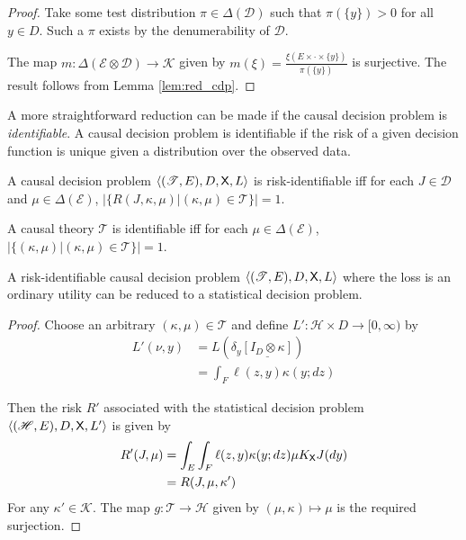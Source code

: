\begin{proof}
Take some test distribution $\pi\in \Delta(\mathcal{D})$ such that $\pi(\{y\})>0$ for all $y\in D$. Such a $\pi$ exists by the denumerability of $\mathcal{D}$.

The map $m:\Delta(\mathcal{E}\otimes\mathcal{D})\to \mathscr{K}$ given by $m(\xi) = \frac{\xi(E\times \cdot\times \{y\})}{\pi(\{y\})}$ is surjective. The result follows from Lemma \ref{lem:red_cdp}.

\end{proof}

A more straightforward reduction can be made if the causal decision problem is \emph{identifiable}. A causal decision problem is identifiable if the risk of a given decision function is unique given a distribution over the observed data.

\begin{definition}[Identifiability]
A causal decision problem $\langle (\mathscr{T}, E), D, \mathsf{X}, L \rangle$ is risk-identifiable iff for each $J\in \mathscr{D}$ and $\mu\in \Delta(\mathcal{E})$, $|\{R(J,\kappa,\mu)|(\kappa,\mu)\in \mathscr{T}\}|=1$.

A causal theory $\mathscr{T}$ is identifiable iff for each $\mu\in \Delta(\mathcal{E})$, $|\{(\kappa,\mu)|(\kappa,\mu)\in\mathscr{T}\}|=1$.
\end{definition}

\begin{theorem}
A risk-identifiable causal decision problem $\langle (\mathscr{T}, E), D, \mathsf{X}, L \rangle$ where the loss is an ordinary utility can be reduced to a statistical decision problem.
\end{theorem}

\begin{proof}


Choose an arbitrary $(\kappa,\mu)\in\mathscr{T}$ and define $L':\mathscr{H}\times D\to [0,\infty)$ by
\begin{align}
    L'(\nu,y) &= L(\delta_y\underline{[I_D\otimes \kappa]})\\
              &= \int_F \ell(z,y) \kappa(y;dz)
\end{align}

Then the risk $R'$ associated with the statistical decision problem $\langle (\mathscr{H},E),D,\mathsf{X},L'\rangle$ is given by 
\begin{align}
    R'(J,\mu) &= \int_E \int_F \ell(z,y)  \kappa (y;dz) \mu K_{\mathsf{X}} J(dy)\\
              &= R(J,\mu,\kappa')
\end{align}
For any $\kappa'\in\mathscr{K}$. The map $g:\mathscr{T}\to\mathscr{H}$ given by $(\mu,\kappa)\mapsto \mu$ is the required surjection.
\end{proof}


